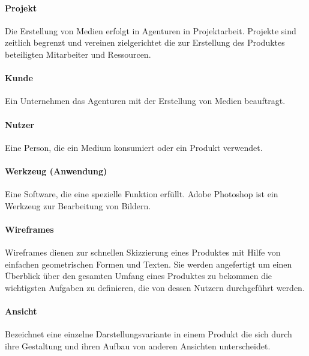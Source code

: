 \paragraph{Projekt} Die Erstellung von Medien erfolgt in Agenturen in Projektarbeit. Projekte sind zeitlich begrenzt und vereinen zielgerichtet die zur Erstellung des Produktes beteiligten Mitarbeiter und Ressourcen. 

\paragraph{Kunde} Ein Unternehmen das Agenturen mit der Erstellung von Medien beauftragt.

\paragraph{Nutzer} Eine Person, die ein Medium konsumiert oder ein Produkt verwendet.

\paragraph{Werkzeug (Anwendung)} Eine Software, die eine spezielle Funktion erfüllt. Adobe Photoshop ist ein Werkzeug zur Bearbeitung von Bildern.

\paragraph{Wireframes} Wireframes dienen zur schnellen Skizzierung eines Produktes mit Hilfe von einfachen geometrischen Formen und Texten. Sie werden angefertigt um einen Überblick über den gesamten Umfang eines Produktes zu bekommen die wichtigsten Aufgaben zu definieren, die von dessen Nutzern durchgeführt werden.

\paragraph{Ansicht} Bezeichnet eine einzelne Darstellungsvariante in einem Produkt die sich durch ihre Gestaltung und ihren Aufbau von anderen Ansichten unterscheidet.

\pagebreak